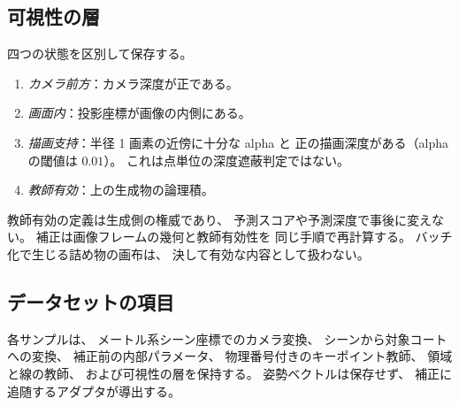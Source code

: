 \subsection{可視性の層}

四つの状態を区別して保存する。

\begin{enumerate}[leftmargin=1.6em]
  \item \emph{カメラ前方}：カメラ深度が正である。
  \item \emph{画面内}：投影座標が画像の内側にある。
  \item \emph{描画支持}：半径 1 画素の近傍に十分な alpha と
  正の描画深度がある（alpha の閾値は \(0.01\)）。
  これは点単位の深度遮蔽判定ではない。
  \item \emph{教師有効}：上の生成物の論理積。
\end{enumerate}

教師有効の定義は生成側の権威であり、
予測スコアや予測深度で事後に変えない。
補正は画像フレームの幾何と教師有効性を
同じ手順で再計算する。
バッチ化で生じる詰め物の画布は、
決して有効な内容として扱わない。

\subsection{データセットの項目}

各サンプルは、
メートル系シーン座標でのカメラ変換、
シーンから対象コートへの変換、
補正前の内部パラメータ、
物理番号付きのキーポイント教師、
領域と線の教師、
および可視性の層を保持する。
姿勢ベクトルは保存せず、
補正に追随するアダプタが導出する。
